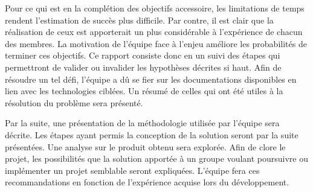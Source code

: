 \documentclass[rapport.tex]{subfiles}
\begin{document}
\par
Pour ce qui est en la complétion des objectifs accessoire, les limitations de temps rendent l’estimation de succès plus difficile. Par contre, il est clair que la réalisation de ceux est apporterait un plus considérable à l’expérience de chacun des membres. La motivation de l’équipe face à l’enjeu améliore les probabilités de terminer ces objectifs. Ce rapport consiste donc en un suivi des étapes qui permettront de valider ou invalider les hypothèses décrites si haut. Afin de résoudre un tel défi, l’équipe a dû se fier sur les documentations disponibles en lien avec les technologies ciblées. Un résumé de celles qui ont été utiles à la résolution du problème sera présenté.
\par
Par la suite, une présentation de la méthodologie utilisée par l’équipe sera décrite. Les étapes ayant permis la conception de la solution seront par la suite présentées. Une analyse sur le produit obtenu sera explorée. Afin de clore le projet, les possibilités que la solution apportée à un groupe voulant poursuivre ou implémenter un projet semblable seront expliquées. L’équipe fera ces recommandations en fonction de l’expérience acquise lors du développement.
\end{document}
